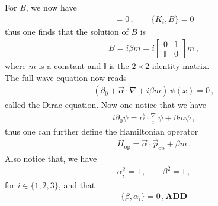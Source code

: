 \documentclass[11pt, onesided]{book}
\theoremstyle{break}
\theoremstyle{break}
\newcommand{\pd}{\partial}
\newcommand{\bmat}[1]{\begin{bmatrix} #1 \end{bmatrix}}
\begin{document}
For $B$, we now have
\begin{align*}
[J_i, B] = 0\,,\qquad\{K_i, B\} = 0
\end{align*}
thus one finds that the solution of $B$ is 
\begin{align*}
B = i\beta m = i \bmat{0 & \mathbb{I} \\ \mathbb{I}& 0} m\,,
\end{align*}
where $m$ is a constant and $\mathbb{I}$ is the $2\times 2$ identity matrix. \\
The full wave equation now reads
\begin{align*}
\left( \pd_0 + \vec{\alpha} \cdot \nabla  + i\beta m\right) \, \psi(x) = 0\,,
\end{align*}
called the Dirac equation. Now one notice that we have
\begin{align*}
i\pd_0 \psi = \vec{\alpha} \cdot \frac{\nabla}{i} \, \psi + \beta m \psi\,,
\end{align*}
thus one can further define the Hamiltonian operator
\begin{align*}
H_{\text{op}} = \vec{\alpha}\cdot \vec{p}_{\text{op}} + \beta m\,.
\end{align*}
Also notice that, we have
\begin{align*}
\alpha_i^2 = 1 \,,\qquad
\beta^2 = 1\,,
\end{align*}
for $i \in \{1,2,3\}$, and that 
\begin{align*}
\{\beta, \alpha_i\} = 0\,,\textbf{ADD}
\end{align*}
\end{document}
